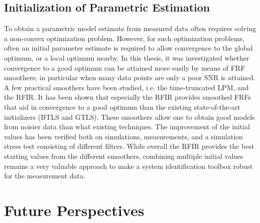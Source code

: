   \subsection{Initialization of Parametric Estimation}
  To obtain a parametric model estimate from measured data often requires solving a non-convex optimization problem.
  However, for such optimization problems, often an initial parameter estimate is required to allow convergence to the global optimum, or a local optimum nearby.
  In this thesis, it was investigated whether convergence to a good optimum can be attained more easily by means of \gls{FRF} smoothers; in particular when many data points are only a poor \gls{SNR} is attained.
  A few practical smoothers have been studied, i.e. the time-truncated \gls{LPM}, and the \gls{RFIR}.
  It has been shown that especially the \gls{RFIR} provides smoothed \glspl{FRF} that aid in convergence to a good optimum than the existing state-of-the-art initializers (\gls{BTLS} and \gls{GTLS}).
  These smoothers allow one to obtain good models from noisier data than what existing techniques.
  The improvement of the initial values has been verified both on simulations, measurements, and a simulation stress test consisting of different filters.
  While overall the \gls{RFIR} provides the best starting values from the different smoothers, combining multiple initial values remains a very valuable approach to make a system identification toolbox robust for the measurement data.

\section{Future Perspectives}
